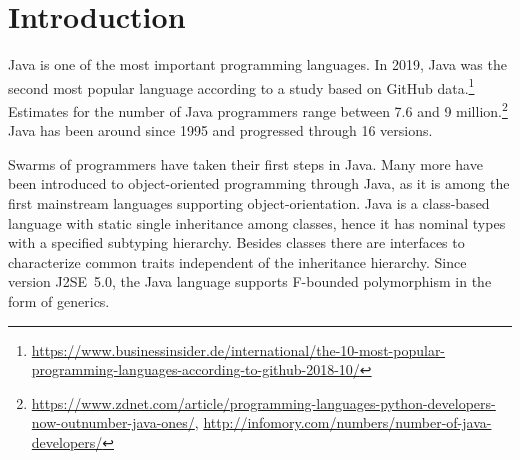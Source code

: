 \section{Introduction}
\label{sec:introduction}

Java is one of the most important programming languages. In 2019, Java
was the second most popular language according to a study
based on GitHub
data.\footnote{\url{https://www.businessinsider.de/international/the-10-most-popular-programming-languages-according-to-github-2018-10/}} Estimates
for the number of Java programmers range between 7.6 and 9 million.\footnote{\url{https://www.zdnet.com/article/programming-languages-python-developers-now-outnumber-java-ones/},
\url{http://infomory.com/numbers/number-of-java-developers/}} Java
has been around since 1995 and progressed through 16 versions.

Swarms of programmers have taken their first steps in Java. Many more
have been introduced to object-oriented programming through Java, as
it is among the first mainstream languages supporting
object-orientation. Java is a class-based language with static single inheritance among
classes, hence it has nominal types with a specified subtyping
hierarchy. Besides classes there are interfaces to characterize common 
traits independent of the inheritance hierarchy. Since version J2SE~5.0,
the Java language supports F-bounded polymorphism in the form of generics.

